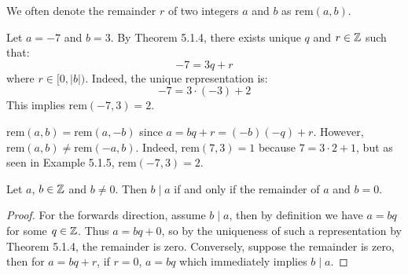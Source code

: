We often denote the remainder $r$ of two integers $a$ and $b$ as $\text{rem}(a,b)$. 

\begin{example}
   Let $a = -7$ and $b = 3$. By Theorem 5.1.4, there exists unique $q$ and $r \in \mathbb{Z}$ such that:
   \[ -7 = 3q + r \]
   where $r \in [0, |b|)$. Indeed, the unique representation is:
   \[ -7 = 3 \cdot (-3) + 2 \] 
   This implies $\text{rem}(-7, 3) = 2$. 
\end{example}

\begin{remark}
   $\text{rem}(a,b) = \text{rem}(a, -b)$ since $a = bq + r = (-b)(-q) + r$. However, $\text{rem}(a,b) \neq \text{rem}(-a, b)$. Indeed, $\text{rem}(7, 3) = 1$ because $7 = 3 \cdot 2 + 1$, but as seen in Example 5.1.5, $\text{rem}(-7, 3) = 2$.
\end{remark}

\begin{corrbox}
   Let $a$, $b \in \mathbb{Z}$ and $b \neq 0$. Then $b \mid a$ if and only if the remainder of $a$ and $b = 0$. 
\end{corrbox}
\begin{proof}
  For the forwards direction, assume $b \mid a$, then by definition we have $a = bq$ for some $q \in \mathbb{Z}$. Thus $a = bq + 0$, so by the uniqueness of such a representation by Theorem 5.1.4, the remainder is zero. Conversely, suppose the remainder is zero, then for $a = bq + r$, if $r = 0$, $a = bq$ which immediately implies $b \mid a$.
\end{proof}
